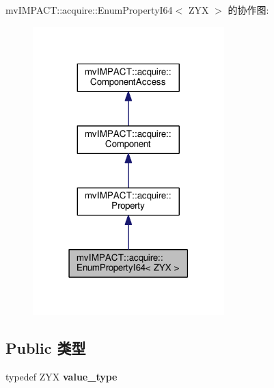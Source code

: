 mv\+I\+M\+P\+A\+C\+T\+:\+:acquire\+:\+:Enum\+Property\+I64$<$ Z\+Y\+X $>$ 的协作图\+:
\nopagebreak
\begin{figure}[H]
\begin{center}
\leavevmode
\includegraphics[width=210pt]{classmv_i_m_p_a_c_t_1_1acquire_1_1_enum_property_i64__coll__graph}
\end{center}
\end{figure}
\subsection*{Public 类型}
\begin{DoxyCompactItemize}
\item 
\hypertarget{classmv_i_m_p_a_c_t_1_1acquire_1_1_enum_property_i64_a94c77b0ad5a247e94fef6dc5c02cb357}{typedef Z\+Y\+X {\bfseries value\+\_\+type}}\label{classmv_i_m_p_a_c_t_1_1acquire_1_1_enum_property_i64_a94c77b0ad5a247e94fef6dc5c02cb357}

\end{DoxyCompactItemize}
